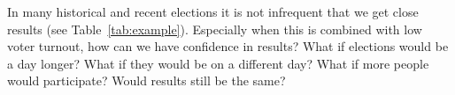 \documentclass[format=acmsmall, review=true, screen=true, anonymous=true]{acmart}
\begin{document}

In many historical and recent elections it is not infrequent that we get close results (see Table~\ref{tab:example}).
Especially when this is combined with low voter turnout, how can we have confidence in results?
What if elections would be a day longer? What if they would be on a different day? What if
more people would participate? Would results still be the same?
\end{document}
